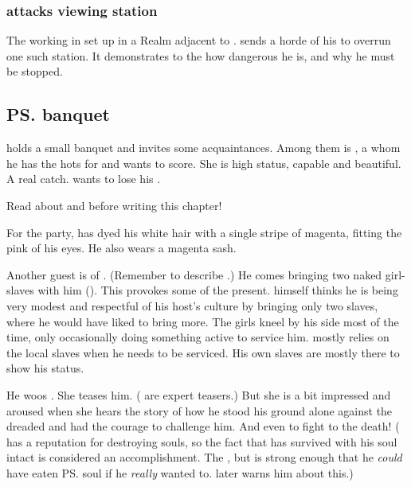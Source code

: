 \subsubsection{\Ishnaruchaefir attacks viewing station}
The \resphain working in \Malcur {} set up in a Realm adjacent to \Azmith. 
\Ishnaruchaefir sends a horde of his \daemons to overrun one such station. 
It demonstrates to the \resphain how dangerous he is, and why he must be stopped.









\subsection{\ps{\Teshrial} banquet}
\Teshrial{} holds a small banquet and invites some \ketheran{} acquaintances. 
Among them is \Firaxel, a \resvil{} whom he has the hots for and wants to score. 
She is high status, capable and beautiful. 
A real catch. 
\Teshrial{} wants to lose his . 

Read about  and  before writing this chapter!

For the party, \Teshrial{} has dyed his white hair with a single stripe of magenta, fitting the pink of his eyes. 
He also wears a magenta sash. 

Another guest is  of \Mystraacht. 
(Remember to describe .) 
He comes bringing two naked girl-slaves with him (). 
This provokes some of the \CiriathSepher{} present. 
\Dezruth{} himself thinks he is being very modest and respectful of his host's culture by bringing only two slaves, where he would have liked to bring more. 
The girls kneel by his side most of the time, only occasionally doing something active to service him. 
\Dezruth{} mostly relies on the local slaves when he needs to be serviced. 
His own slaves are mostly there to show his status. 

He woos \Firaxel. 
She teases him. 
(\Resviel{} are expert teasers.)
But she is a bit impressed and aroused when she hears the story of how he stood his ground alone against the dreaded \Ishnaruchaefir{} and had the courage to challenge him. 
And even to fight to the death! 
(\Ishnaruchaefir{} has a reputation for destroying souls, so the fact that \Teshrial{} has survived with his soul intact is considered an accomplishment.
The , but \Ishnaruchaefir{} is strong enough that he \emph{could} have eaten \ps{\Teshrial} soul if he \emph{really} wanted to.
\Menessiaraid{} later warns him about this.)


